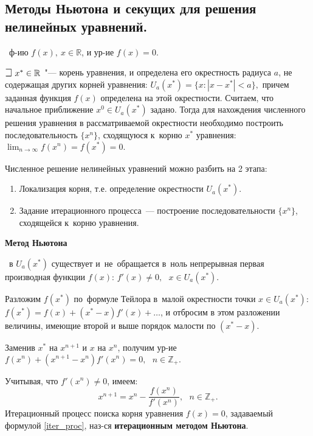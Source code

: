 \subsection{Методы Ньютона и секущих для решения нелинейных уравнений.}



\faEye \ ф-ию $f(x), ~x\in \mathbb{R}$, и ур-ие $f(x)=0.$

$\mathLet ~ x^* \in \mathbb{R}$~"--- корень уравнения, и определена его
окрестность радиуса $a$, не содержащая других корней уравнения: 
$U_a(x^*)=\{x:|x-x^*| < a\},$
причем заданная функция $f(x)$ определена на этой окрестности.
Считаем, что начальное приближение $x^0 \in U_a(x^*)$ задано.
Тогда для нахождения численного решения уравнения в
рассматриваемой окрестности необходимо построить последовательность
$\{x^n\}$, сходящуюся к~корню $x^*$ уравнения:
$\lim_{n\rightarrow\infty}f(x^n) = f(x^*) = 0.$
    
Численное решение нелинейных уравнений можно разбить на 2 этапа:
\begin{enumerate}
    \item Локализация корня, т.е. определение окрестности $U_a(x^*)$.
    \item Задание итерационного процесса~— построение последовательности
    $\{x^n\}$, сходящейся к~корню уравнения.
\end{enumerate}

\centerline{\textbf{Метод Ньютона}}

\mathLet \ в $U_a(x^*)$ существует и~не~обращается в~ноль непрерывная
первая производная функции $f(x)$: $f'(x) \neq 0,~~~x\in U_a(x^*).$

Разложим $f(x^*)$ по~формуле Тейлора в~малой окрестности точки $x\in U_a(x^*)$:
$f(x^*) =  f(x) + (x^* - x)f'(x) + \dots$, 
и отбросим в этом разложении величины, имеющие второй и выше порядок малости
по $(x^* - x)$.

Заменив $x^*$ на $x^{n+1}$ и $x$ на $x^n$, получим ур-ие 
$ f(x^n) + (x^{n + 1} - x^n)f'(x^n) = 0,~~~n\in \mathbb{Z}_+.$

Учитывая, что $f'(x^n) \neq 0$, имеем:
%
    \begin{equation}
        \label{iter_proc}
        x^{n + 1} = x^n - \frac{f(x^n)}{f'(x^n)},~~~n \in \mathbb{Z}_+.
    \end{equation}
%
Итерационный процесс поиска корня уравнения $f(x)=0$, задаваемый формулой \eqref{iter_proc},
наз-ся \textbf{итерационным методом Ньютона}.

